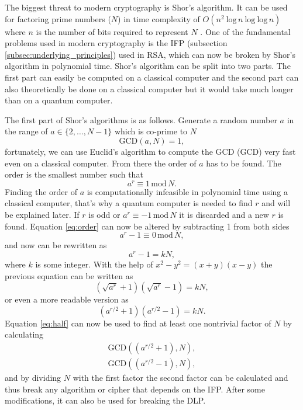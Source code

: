 The biggest threat to modern cryptography is Shor's algorithm. It can be used for factoring prime numbers ($N$) in time complexity of $O(n^2\ \mathrm{log}\,n\ \mathrm{log}\ \mathrm{log}\,n)$ where $n$ is the number of bits required to represent $N$ \cite{Yanofsky2008}. One of the fundamental problems used in modern cryptography is the IFP (subsection \ref{subsec:underlying_principles}) used in RSA, which can now be broken by Shor's algorithm in polynomial time. Shor's algorithm can be split into two parts. The first part can easily be computed on a classical computer and the second part can also theoretically be done on a classical computer but it would take much longer than on a quantum computer.

The first part of Shor's algorithms is as follows. Generate a random number $a$ in the range of $a\in\{2,\dots,N-1\}$ which is co-prime to $N$
\begin{equation}
  \mathrm{GCD}(a, N) = 1,
\end{equation}
fortunately, we can use Euclid's algorithm to compute the GCD (\acl{GCD}) very fast even on a classical computer. From there the order of $a$ has to be found. The order is the smallest number such that
\begin{equation}
  \label{eq:order}
  a^r \equiv 1\,\mathrm{mod}\,N.
\end{equation}
Finding the order of $a$ is computationally infeasible in polynomial time using a classical computer, that's why a quantum computer is needed to find $r$ and will be explained later. If $r$ is odd or $a^r\equiv-1\,\mathrm{mod}\,N$ it is discarded and a new $r$ is found. Equation \ref{eq:order} can now be altered by subtracting 1 from both sides
\begin{equation}
  a^r -1\equiv 0\,\mathrm{mod}\,N,
\end{equation}
and now can be rewritten as
\begin{equation}
  a^r -1=kN,
\end{equation}
where $k$ is some integer. With the help of $x^2 - y^2=(x+y)(x-y)$ the previous equation can be written as
\begin{equation}
  (\sqrt{a^r}+1)(\sqrt{a^r}-1)= kN,
\end{equation}
or even a more readable version as
\begin{equation}
  \label{eq:half}
  (a^{r/2}+1)(a^{r/2}-1)= kN.
\end{equation}
Equation \ref{eq:half} can now be used to find at least one nontrivial factor of $N$ by calculating
\begin{equation}
  \begin{aligned}
    \mathrm{GCD}((a^{r/2}+1), N), \\
    \mathrm{GCD}((a^{r/2}-1), N),
  \end{aligned}
\end{equation}
and by dividing $N$ with the first factor the second factor can be calculated and thus break any algorithm or cipher that depends on the IFP. After some modifications, it can also be used for breaking the DLP. \cite{Yanofsky2008}\cite{Pittenger2000}

